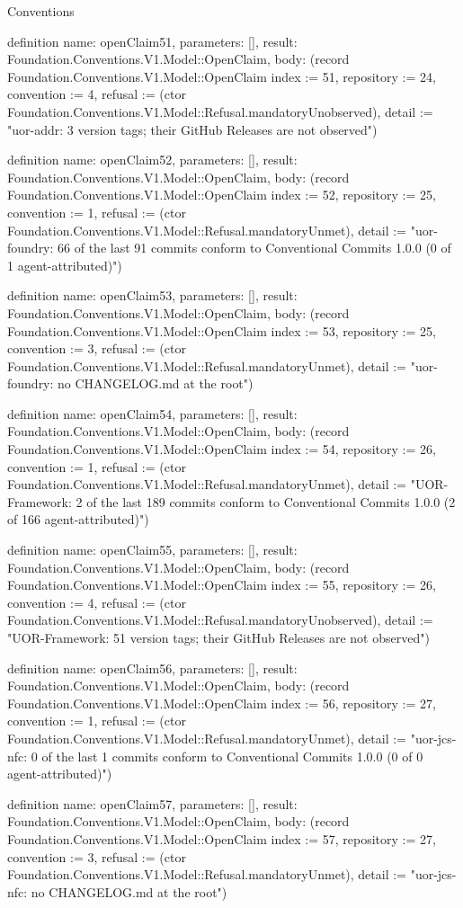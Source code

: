 \begin{lexlean}{Conventions}
\begin{semanticmodule}
definition{
  name: openClaim51,
  parameters: [],
  result: Foundation.Conventions.V1.Model::OpenClaim,
  body: (record Foundation.Conventions.V1.Model::OpenClaim {index := 51, repository := 24, convention := 4, refusal := (ctor Foundation.Conventions.V1.Model::Refusal.mandatoryUnobserved), detail := "uor-addr: 3 version tags; their GitHub Releases are not observed"})
}

definition{
  name: openClaim52,
  parameters: [],
  result: Foundation.Conventions.V1.Model::OpenClaim,
  body: (record Foundation.Conventions.V1.Model::OpenClaim {index := 52, repository := 25, convention := 1, refusal := (ctor Foundation.Conventions.V1.Model::Refusal.mandatoryUnmet), detail := "uor-foundry: 66 of the last 91 commits conform to Conventional Commits 1.0.0 (0 of 1 agent-attributed)"})
}

definition{
  name: openClaim53,
  parameters: [],
  result: Foundation.Conventions.V1.Model::OpenClaim,
  body: (record Foundation.Conventions.V1.Model::OpenClaim {index := 53, repository := 25, convention := 3, refusal := (ctor Foundation.Conventions.V1.Model::Refusal.mandatoryUnmet), detail := "uor-foundry: no CHANGELOG.md at the root"})
}

definition{
  name: openClaim54,
  parameters: [],
  result: Foundation.Conventions.V1.Model::OpenClaim,
  body: (record Foundation.Conventions.V1.Model::OpenClaim {index := 54, repository := 26, convention := 1, refusal := (ctor Foundation.Conventions.V1.Model::Refusal.mandatoryUnmet), detail := "UOR-Framework: 2 of the last 189 commits conform to Conventional Commits 1.0.0 (2 of 166 agent-attributed)"})
}

definition{
  name: openClaim55,
  parameters: [],
  result: Foundation.Conventions.V1.Model::OpenClaim,
  body: (record Foundation.Conventions.V1.Model::OpenClaim {index := 55, repository := 26, convention := 4, refusal := (ctor Foundation.Conventions.V1.Model::Refusal.mandatoryUnobserved), detail := "UOR-Framework: 51 version tags; their GitHub Releases are not observed"})
}

definition{
  name: openClaim56,
  parameters: [],
  result: Foundation.Conventions.V1.Model::OpenClaim,
  body: (record Foundation.Conventions.V1.Model::OpenClaim {index := 56, repository := 27, convention := 1, refusal := (ctor Foundation.Conventions.V1.Model::Refusal.mandatoryUnmet), detail := "uor-jcs-nfc: 0 of the last 1 commits conform to Conventional Commits 1.0.0 (0 of 0 agent-attributed)"})
}

definition{
  name: openClaim57,
  parameters: [],
  result: Foundation.Conventions.V1.Model::OpenClaim,
  body: (record Foundation.Conventions.V1.Model::OpenClaim {index := 57, repository := 27, convention := 3, refusal := (ctor Foundation.Conventions.V1.Model::Refusal.mandatoryUnmet), detail := "uor-jcs-nfc: no CHANGELOG.md at the root"})
}


\end{semanticmodule}
\end{lexlean}
